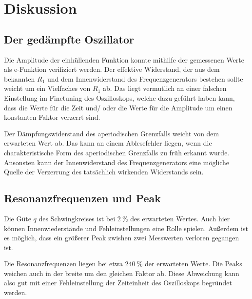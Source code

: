 

\section{Diskussion}

\subsection{Der gedämpfte Oszillator}
Die Amplitude der einhüllenden Funktion konnte mithilfe der gemessenen Werte als e-Funktion verifiziert werden.
Der effektive Widerstand, der aus dem bekannten $R_1$ und dem Innenwiderstand des Frequenzgenerators bestehen sollte weicht
um ein Vielfaches von $R_1$ ab. 
Das liegt vermutlich an einer falschen Einstellung im Finetuning des Oszilloskops, welche dazu geführt haben kann, dass die Werte für die
Zeit und/ oder die Werte für die Amplitude um einen konstanten Faktor verzerrt sind.

Der Dämpfungswiderstand des aperiodischen Grenzfalls weicht von dem erwarteten Wert ab.
Das kann an einem Ablesefehler liegen, wenn die charakteristische Form des aperiodischen Grenzfalls zu früh erkannt wurde.
Ansonsten kann der Innenwiderstand des Frequenzgenerators eine mögliche Quelle der Verzerrung des tatsächlich wirkenden Widerstands sein.

\subsection{Resonanzfrequenzen und Peak}
Die Güte $q$ des Schwingkreises ist bei $\qty{2}{\percent}$  des erwarteten Wertes.
Auch hier können Innenwiederstände und Fehleinstellungen eine Rolle spielen.
Außerdem ist es möglich, dass ein größerer Peak zwishen zwei Messwerten verloren gegangen ist.

Die Resonanzfrequenzen liegen bei etwa $\qty{240}{\percent}$ der erwarteten Werte. 
Die Peaks weichen auch in der breite um den gleichen Faktor ab.
Diese Abweichung kann also gut mit einer Fehleinstellung der Zeiteinheit des Oszilloskops begründet werden.